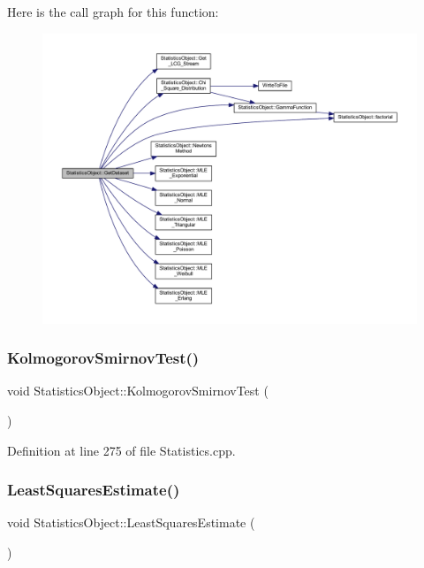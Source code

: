 Here is the call graph for this function\+:
\nopagebreak
\begin{figure}[H]
\begin{center}
\leavevmode
\includegraphics[width=350pt]{class_statistics_object_a38f772ec93c2e0631cb101aff8296b54_cgraph}
\end{center}
\end{figure}
\mbox{\label{class_statistics_object_aedec675916379850f8d53897cf5386b1}} 
\subsubsection{\texorpdfstring{Kolmogorov\+Smirnov\+Test()}{KolmogorovSmirnovTest()}}
{\footnotesize\ttfamily void Statistics\+Object\+::\+Kolmogorov\+Smirnov\+Test (\begin{DoxyParamCaption}{ }\end{DoxyParamCaption})}



Definition at line 275 of file Statistics.\+cpp.

\mbox{\label{class_statistics_object_a14eb03b68eaa7a26769390ff81915a25}} 
\subsubsection{\texorpdfstring{Least\+Squares\+Estimate()}{LeastSquaresEstimate()}}
{\footnotesize\ttfamily void Statistics\+Object\+::\+Least\+Squares\+Estimate (\begin{DoxyParamCaption}{ }\end{DoxyParamCaption})}



